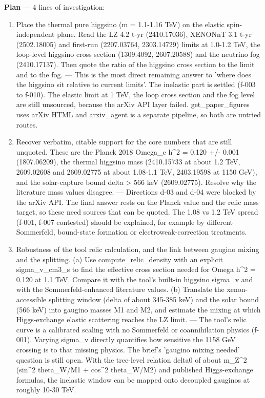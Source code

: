 \documentclass[11pt,a4paper]{article}
\begin{document}
\textbf{Plan} --- 4 lines of investigation:

\begin{enumerate}
  \item Place the thermal pure higgsino (m = 1.1-1.16 TeV) on the elastic spin-independent plane. Read the LZ 4.2 t-yr (2410.17036), XENONnT 3.1 t-yr (2502.18005) and first-run (2207.03764, 2303.14729) limits at 1.0-1.2 TeV, the loop-level higgsino cross section (1309.4092, 2607.20588) and the neutrino fog (2410.17137). Then quote the ratio of the higgsino cross section to the limit and to the fog. --- This is the most direct remaining answer to 'where does the higgsino sit relative to current limits'. The inelastic part is settled (f-003 to f-010). The elastic limit at 1 TeV, the loop cross section and the fog level are still unsourced, because the arXiv API layer failed. get\_paper\_figures uses arXiv HTML and arxiv\_agent is a separate pipeline, so both are untried routes.
  \item Recover verbatim, citable support for the core numbers that are still unquoted. These are the Planck 2018 Omega\_c h\textasciicircum{}2 = 0.120 +/- 0.001 (1807.06209), the thermal higgsino mass (2410.15733 at about 1.2 TeV, 2609.02608 and 2609.02775 at about 1.08-1.1 TeV, 2403.19598 at 1150 GeV), and the solar-capture bound delta \textgreater{} 566 keV (2609.02775). Resolve why the literature mass values disagree. --- Directions d-03 and d-04 were blocked by the arXiv API. The final answer rests on the Planck value and the relic mass target, so these need sources that can be quoted. The 1.08 vs 1.2 TeV spread (f-001, f-007 contested) should be explained, for example by different Sommerfeld, bound-state formation or electroweak-correction treatments.
  \item Robustness of the tool relic calculation, and the link between gaugino mixing and the splitting. (a) Use compute\_relic\_density with an explicit sigma\_v\_cm3\_s to find the effective cross section needed for Omega h\textasciicircum{}2 = 0.120 at 1.1 TeV. Compare it with the tool's built-in higgsino sigma\_v and with the Sommerfeld-enhanced literature values. (b) Translate the xenon-accessible splitting window (delta of about 345-385 keV) and the solar bound (566 keV) into gaugino masses M1 and M2, and estimate the mixing at which Higgs-exchange elastic scattering reaches the LZ limit. --- The tool's relic curve is a calibrated scaling with no Sommerfeld or coannihilation physics (f-001). Varying sigma\_v directly quantifies how sensitive the 1158 GeV crossing is to that missing physics. The brief's 'gaugino mixing needed' question is still open. With the tree-level relation delta0 of about m\_Z\textasciicircum{}2 (sin\textasciicircum{}2 theta\_W/M1 + cos\textasciicircum{}2 theta\_W/M2) and published Higgs-exchange formulas, the inelastic window can be mapped onto decoupled gauginos at roughly 10-30 TeV.

\end{enumerate}
\end{document}
